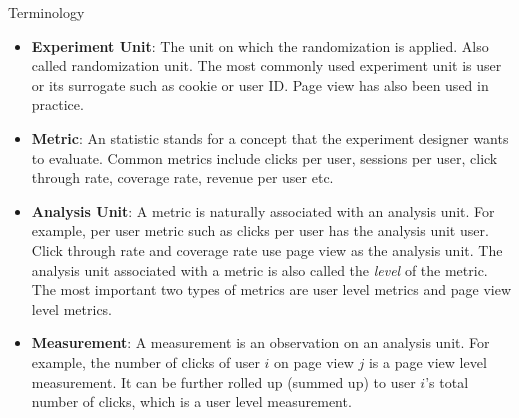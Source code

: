 \documentclass[xcolor=x11names,table]{beamer}
\begin{document}
\begin{frame}{Terminology}
\small
\begin{itemize}
\item {\bf Experiment Unit}: The unit on which the randomization is applied. Also called randomization unit. The most commonly used experiment unit is user or its surrogate such as cookie or user ID. Page view has also been used in practice.  
\pause
\item {\bf Metric}: An statistic stands for a concept that the experiment designer wants to evaluate. Common metrics include clicks per user, sessions per user, click through rate, coverage rate, revenue per user etc. 
\pause
\item {\bf Analysis Unit}: A metric is naturally associated with an analysis unit. For example, per user metric such as clicks per user has the analysis unit user. Click through rate and coverage rate use page view as the analysis unit. The analysis unit associated with a metric is also called the \emph{level} of the metric. The most important two types of metrics are user level metrics and page view level metrics.  
\pause
\item {\bf Measurement}: A measurement is an observation on an analysis unit. For example, the number of clicks of user $i$ on page view $j$ is a page view level measurement. It can be further rolled up (summed up) to user $i$'s total number of clicks, which is a user level measurement. 
\end{itemize}
\end{frame}
\end{document}
